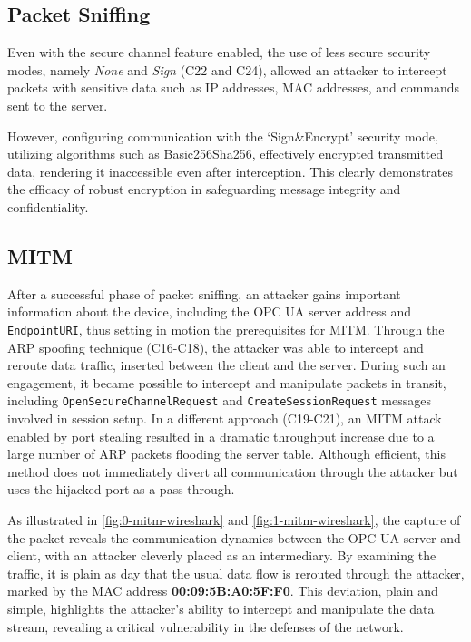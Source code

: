 \documentclass[pdflatex,sn-mathphys-num,iicol]{sn-jnl}%
\begin{document}
\subsection{Packet Sniffing}

Even with the secure channel feature enabled, the use of less secure security modes, namely \textit{None} and \textit{Sign} (C22 and C24), allowed an attacker to intercept packets with sensitive data such as IP addresses, MAC addresses, and commands sent to the server.

However, configuring communication with the `Sign\&Encrypt' security mode, utilizing algorithms such as Basic256Sha256, effectively encrypted transmitted data, rendering it inaccessible even after interception. This clearly demonstrates the efficacy of robust encryption in safeguarding message integrity and confidentiality.

\subsection{MITM}

After a successful phase of packet sniffing, an attacker gains important information about the device, including the OPC UA server address and \texttt{EndpointURI}, thus setting in motion the prerequisites for MITM. Through the ARP spoofing technique (C16-C18), the attacker was able to intercept and reroute data traffic, inserted between the client and the server. During such an engagement, it became possible to intercept and manipulate packets in transit, including \texttt{OpenSecureChannelRequest} and \texttt{CreateSessionRequest} messages involved in session setup. In a different approach (C19-C21), an MITM attack enabled by port stealing resulted in a dramatic throughput increase due to a large number of ARP packets flooding the server table. Although efficient, this method does not immediately divert all communication through the attacker but uses the hijacked port as a pass-through.

As illustrated in \autoref{fig:0-mitm-wireshark} and \autoref{fig:1-mitm-wireshark}, the capture of the packet reveals the communication dynamics between the OPC UA server and client, with an attacker cleverly placed as an intermediary. By examining the traffic, it is plain as day that the usual data flow is rerouted through the attacker, marked by the MAC address \textbf{00:09:5B:A0:5F:F0}. This deviation, plain and simple, highlights the attacker's ability to intercept and manipulate the data stream, revealing a critical vulnerability in the defenses of the network.
\end{document}
